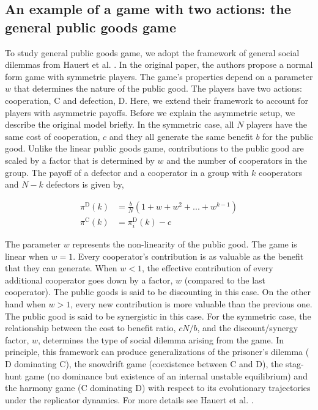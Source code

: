 \documentclass[11pt]{article}
\theoremstyle{plainCl1}
\theoremstyle{plainCl2}
\newcommand{\C}{\mathrm{C}}
\newcommand{\D}{\mathrm{D}}
\begin{document}
\subsection*{An example of a  game with two actions: the general public goods game}

To study general public goods game, we adopt the framework of general social dilemmas from Hauert et al. \cite{Hauert:JTB:2006a}. In the original paper, the authors propose a normal form game with symmetric players. The game's properties depend on a parameter $w$ that determines the nature of the public good. The players have two actions: cooperation, $\C$ and defection, $\D$. Here, we extend their framework to account for players with asymmetric payoffs. Before we explain the asymmetric setup, we describe the original model briefly. In the symmetric case, all $N$ players have the same cost of cooperation, $c$ and they all generate the same benefit $b$ for the public good. Unlike the linear public goods game, contributions to the public good are scaled by a factor that is determined by $w$ and the number of cooperators in the group. The payoff of a defector and a cooperator in a group with $k$ cooperators and $N-k$ defectors is given by, 

\begin{align}
\pi^{\D}(k) &= \frac{b}{N}(1 + w + w^2 + ... + w^{k-1}) \\[15pt]
\pi^{\C}(k) &= \pi^{\D}_i(k) - c
\label{Eq:payoff-synergistic-symmetric}
\end{align} 

\noindent The parameter $w$ represents the non-linearity of the public good. The game is linear when $w = 1$. Every cooperator's contribution is as valuable as the benefit that they can generate. When $w < 1$, the effective contribution of every additional cooperator goes down by a factor, $w$ (compared to the last cooperator). The public goods is said to be discounting in this case. On the other hand when $w > 1$, every new contribution is more valuable than the previous one. The public good is said to be synergistic in this case. For the symmetric case, the relationship between the cost to benefit ratio, $cN/b$, and the discount/synergy factor, $w$, determines the type of social dilemma arising from the game. In principle, this framework can produce generalizations of the prisoner's dilemma ($\D$ dominating $\C$), the snowdrift game (coexistence between $\C$ and $\D$), the stag-hunt game (no dominance but existence of an internal unstable equilibrium) and the harmony game ($\C$ dominating $\D$) with respect to its evolutionary trajectories under the replicator dynamics. For more details see Hauert et al. \cite{Hauert:JTB:2006a}. \\ 
\end{document}
